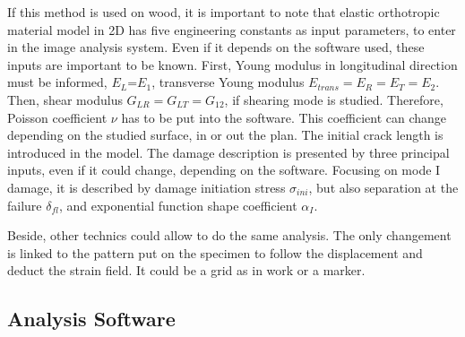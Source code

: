 If this method is used on wood, it is important to note that elastic orthotropic material model in 2D has five engineering constants as input parameters, to enter in the image analysis system. Even if it depends on the software used, these inputs are important to be known. First, Young modulus in longitudinal direction must be informed, $E_{L}$=$E_{1}$, transverse Young modulus $E_{trans}=E_{R}=E_{T}=E_{2}$. Then, shear modulus $G_{LR}=G_{LT}=G_{12}$, if shearing mode is studied. Therefore, Poisson coefficient $\nu$ has to be put into the software. This coefficient can change depending on the studied surface, in or out the plan. The initial crack length is introduced in the model. The damage description is presented by three principal inputs, even if it could change, depending on the software. Focusing on mode I damage, it is described by damage initiation stress $\sigma_{ini}$, but also separation at the failure $\delta_{fl}$, and exponential function shape coefficient $\alpha_{I}$. 

Beside, other technics could allow to do the same analysis. The only changement is linked to the pattern put on the specimen to follow the displacement and deduct the strain field. It could be a grid as in \parencite{Reference7} work or a marker.

\subsection{Analysis Software}

